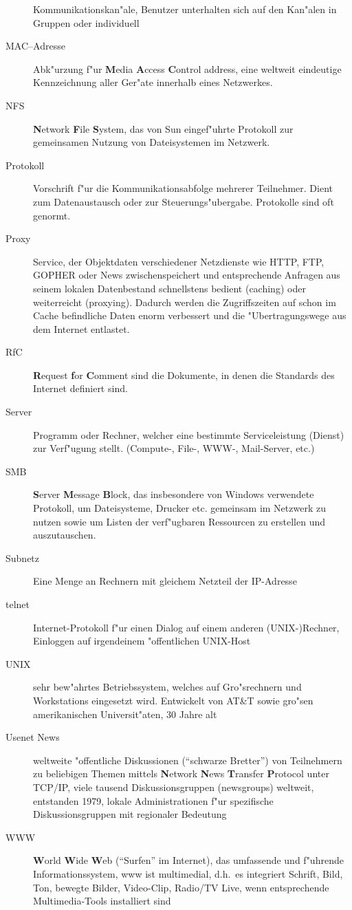 \documentclass[12pt,titlepage,twoside]{scrartcl}
\begin{document}
\begin{appendix}
\begin{description}
    Kommunikationskan"ale, Benutzer unterhalten sich auf den Kan"alen in
    Gruppen oder individuell
  \item[MAC--Adresse] Abk"urzung f"ur \textbf{M}edia \textbf{A}ccess
    \textbf{C}ontrol address, eine weltweit eindeutige Kennzeichnung aller
    Ger"ate innerhalb eines Netzwerkes.
  \item[NFS] \textbf{N}etwork \textbf{F}ile \textbf{S}ystem, das von Sun
    eingef"uhrte Protokoll zur gemeinsamen Nutzung von Dateisystemen im
    Netzwerk.
  \item[Protokoll] Vorschrift f"ur die Kommunikationsabfolge mehrerer
    Teilnehmer. Dient zum Datenaustausch oder zur Steuerungs"ubergabe.
    Protokolle sind oft genormt.
  \item[Proxy] Service, der Objektdaten verschiedener Netzdienste wie HTTP,
    FTP, GOPHER oder News zwischenspeichert und entsprechende Anfragen aus
    seinem lokalen Datenbestand schnellstens bedient (caching) oder
    weiterreicht (proxying). Dadurch werden die Zugriffszeiten auf schon im
    Cache befindliche Daten enorm verbessert und die "Ubertragungswege aus dem
    Internet entlastet.
  \item[RfC] \textbf{R}equest \textbf{f}or \textbf{C}omment sind die
    Dokumente, in denen die Standards des Internet definiert sind.
  \item[Server] Programm oder Rechner, welcher eine bestimmte Serviceleistung
    (Dienst) zur Verf"ugung stellt. (Compute-, File-, WWW-, Mail-Server, etc.)
  \item[SMB] \textbf{S}erver \textbf{M}essage \textbf{B}lock, das insbesondere
    von Windows verwendete Protokoll, um Dateisysteme, Drucker etc. gemeinsam
    im Netzwerk zu nutzen sowie um Listen der verf"ugbaren Ressourcen zu
    erstellen und auszutauschen.
  \item[Subnetz] Eine Menge an Rechnern mit gleichem Netzteil der IP-Adresse
  \item[telnet] Internet-Protokoll f"ur einen Dialog auf einem anderen
    (UNIX-)Rechner, Einloggen auf irgendeinem "offentlichen UNIX-Host
  \item[UNIX] sehr bew"ahrtes Betriebssystem, welches auf Gro"srechnern und
    Workstations eingesetzt wird. Entwickelt von AT\&T sowie gro"sen
    amerikanischen Universit"aten, 30 Jahre alt
  \item[Usenet News] weltweite "offentliche Diskussionen ("`schwarze Bretter"')
    von Teilnehmern zu beliebigen Themen mittels \textbf{N}etwork
    \textbf{N}ews \textbf{T}ransfer \textbf{P}rotocol unter TCP/IP, viele
    tausend Diskussionsgruppen (newsgroups) weltweit, entstanden 1979, lokale
    Administrationen f"ur spezifische Diskussionsgruppen mit regionaler
    Bedeutung
  \item[WWW] \textbf{W}orld \textbf{W}ide \textbf{W}eb ("`Surfen"' im
    Internet), das umfassende und f"uhrende Informationssystem, www ist
    multimedial, d.h.\  es integriert Schrift, Bild, Ton, bewegte Bilder,
    Video-Clip, Radio/TV Live, wenn entsprechende Multimedia-Tools installiert
    sind
\end{description}

\end{appendix}
\end{document}
